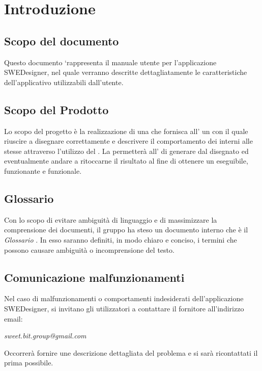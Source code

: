 \section{Introduzione}
  \subsection{Scopo del documento}
          Questo documento `rappresenta il manuale utente per l'applicazione SWEDesigner, nel quale verranno descritte dettagliatamente le caratteristiche dell'applicativo utilizzabili dall'utente.
  \subsection{Scopo del Prodotto}
          Lo scopo del progetto è la realizzazione di una  che fornisca all' un   con il quale riuscire a disegnare correttamente 
          e descrivere il comportamento dei  interni alle stesse attraverso l'utilizzo del .
          La  permetterà all' di generare   dal  disegnato ed eventualmente andare a ritoccarne il risultato al fine di ottenere un 
          eseguibile, funzionante e funzionale.
  \subsection{Glossario}
          Con lo scopo di evitare ambiguità di linguaggio e di massimizzare la comprensione dei documenti, il
          gruppo ha steso un documento interno che è il \emph{Glossario \VersioneG{}}. In esso saranno definiti, in modo
          chiaro e conciso, i termini che possono causare ambiguità o incomprensione del testo.
  \subsection{Comunicazione malfunzionamenti}
  Nel caso di malfunzionamenti o comportamenti indesiderati dell'applicazione SWEDesigner, si invitano gli utilizzatori a contattare il fornitore all'indirizzo email:\\
  \begin{center}
  \emph{sweet.bit.group@gmail.com}
  \end{center}
Occorrerà fornire une descrizione dettagliata del problema e si sarà ricontattati il prima possibile.